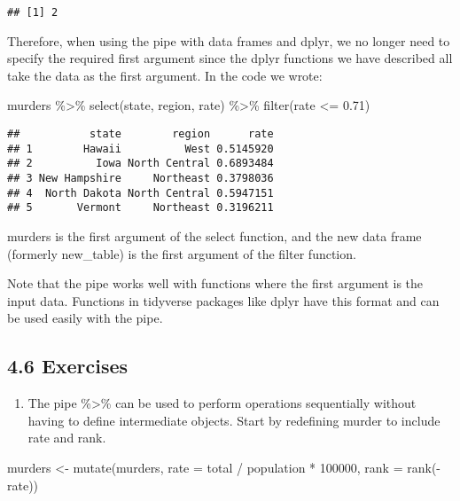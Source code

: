 \documentclass[
]{article}
\newenvironment{Shaded}{\begin{snugshade}}{\end{snugshade}}
\newcommand{\AttributeTok}[1]{\textcolor[rgb]{0.77,0.63,0.00}{#1}}
\newcommand{\DecValTok}[1]{\textcolor[rgb]{0.00,0.00,0.81}{#1}}
\newcommand{\FloatTok}[1]{\textcolor[rgb]{0.00,0.00,0.81}{#1}}
\newcommand{\FunctionTok}[1]{\textcolor[rgb]{0.00,0.00,0.00}{#1}}
\newcommand{\NormalTok}[1]{#1}
\newcommand{\OtherTok}[1]{\textcolor[rgb]{0.56,0.35,0.01}{#1}}
\newcommand{\SpecialCharTok}[1]{\textcolor[rgb]{0.00,0.00,0.00}{#1}}
\providecommand{\tightlist}{%
  \setlength{\itemsep}{0pt}\setlength{\parskip}{0pt}}
\begin{document}
\begin{verbatim}
## [1] 2
\end{verbatim}

Therefore, when using the pipe with data frames and dplyr, we no longer
need to specify the required first argument since the dplyr functions we
have described all take the data as the first argument. In the code we
wrote:

\begin{Shaded}
\begin{Highlighting}[]
\NormalTok{murders }\SpecialCharTok{\%\textgreater{}\%} \FunctionTok{select}\NormalTok{(state, region, rate) }\SpecialCharTok{\%\textgreater{}\%} \FunctionTok{filter}\NormalTok{(rate }\SpecialCharTok{\textless{}=} \FloatTok{0.71}\NormalTok{)}
\end{Highlighting}
\end{Shaded}

\begin{verbatim}
##           state        region      rate
## 1        Hawaii          West 0.5145920
## 2          Iowa North Central 0.6893484
## 3 New Hampshire     Northeast 0.3798036
## 4  North Dakota North Central 0.5947151
## 5       Vermont     Northeast 0.3196211
\end{verbatim}

murders is the first argument of the select function, and the new data
frame (formerly new\_table) is the first argument of the filter
function.

Note that the pipe works well with functions where the first argument is
the input data. Functions in tidyverse packages like dplyr have this
format and can be used easily with the pipe.

\hypertarget{exercises-2}{%
\subsection{4.6 Exercises}\label{exercises-2}}

\begin{enumerate}
\def\labelenumi{\arabic{enumi}.}
\tightlist
\item
  The pipe \%\textgreater\% can be used to perform operations
  sequentially without having to define intermediate objects. Start by
  redefining murder to include rate and rank.
\end{enumerate}

\begin{Shaded}
\begin{Highlighting}[]
\NormalTok{murders }\OtherTok{\textless{}{-}} \FunctionTok{mutate}\NormalTok{(murders, }\AttributeTok{rate =}\NormalTok{  total }\SpecialCharTok{/}\NormalTok{ population }\SpecialCharTok{*} \DecValTok{100000}\NormalTok{, }\AttributeTok{rank =} \FunctionTok{rank}\NormalTok{(}\SpecialCharTok{{-}}\NormalTok{rate))}
\end{Highlighting}
\end{Shaded}
\end{document}
